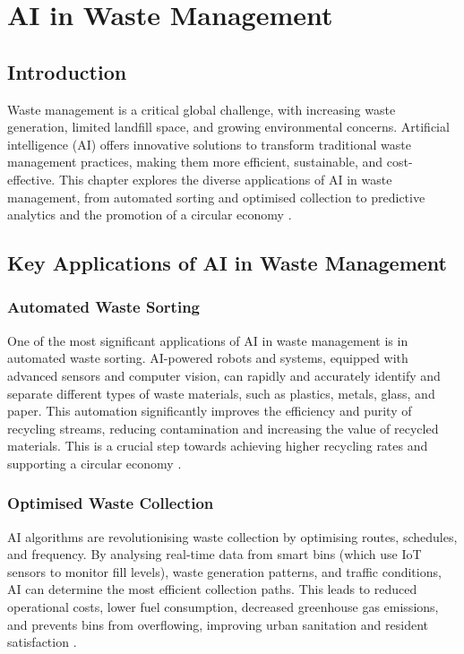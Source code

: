 \chapter{AI in Waste Management}
\label{cha:ai_in_waste_management}

\section{Introduction}

Waste management is a critical global challenge, with increasing waste generation, limited landfill space, and growing environmental concerns. Artificial intelligence (AI) offers innovative solutions to transform traditional waste management practices, making them more efficient, sustainable, and cost-effective. This chapter explores the diverse applications of AI in waste management, from automated sorting and optimised collection to predictive analytics and the promotion of a circular economy \parencite{fang2023artificial}.

\section{Key Applications of AI in Waste Management}

\subsection{Automated Waste Sorting}

One of the most significant applications of AI in waste management is in automated waste sorting. AI-powered robots and systems, equipped with advanced sensors and computer vision, can rapidly and accurately identify and separate different types of waste materials, such as plastics, metals, glass, and paper. This automation significantly improves the efficiency and purity of recycling streams, reducing contamination and increasing the value of recycled materials. This is a crucial step towards achieving higher recycling rates and supporting a circular economy \parencite{sharma2023wastemanagement}.

\subsection{Optimised Waste Collection}

AI algorithms are revolutionising waste collection by optimising routes, schedules, and frequency. By analysing real-time data from smart bins (which use IoT sensors to monitor fill levels), waste generation patterns, and traffic conditions, AI can determine the most efficient collection paths. This leads to reduced operational costs, lower fuel consumption, decreased greenhouse gas emissions, and prevents bins from overflowing, improving urban sanitation and resident satisfaction \parencite{fang2023artificial}.

